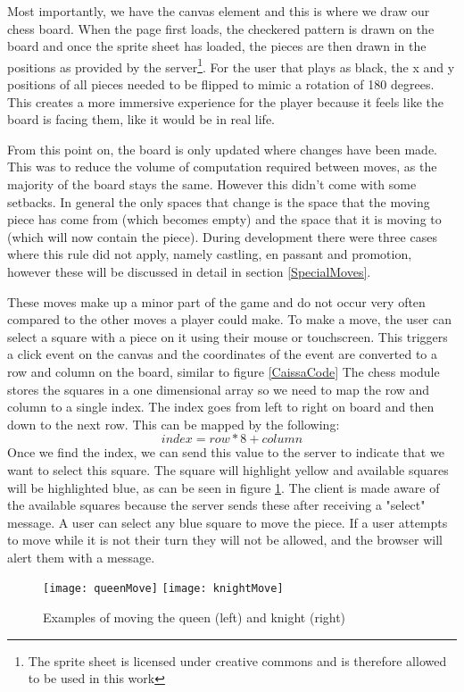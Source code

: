 Most importantly, we have the canvas element and this is where we draw our chess board. When the page first loads, the checkered pattern is drawn on the board and once the sprite sheet \cite{SpriteSheet} has loaded, the pieces are then drawn in the positions as provided by the server\footnote{The sprite sheet is licensed under creative commons and is therefore allowed to be used in this work}. For the user that plays as black, the x and y positions of all pieces needed to be flipped to mimic a rotation of 180 degrees. This creates a more immersive experience for the player because it feels like the board is facing them, like it would be in real life.

From this point on, the board is only updated where changes have been made. This was to reduce the volume of computation required between moves, as the majority of the board stays the same. However this didn't come with some setbacks. In general the only spaces that change is the space that the moving piece has come from (which becomes empty) and the space that it is moving to (which will now contain the piece). During development there were three cases where this rule did not apply, namely castling, en passant and promotion, however these will be discussed in detail in section \ref{SpecialMoves}.

These moves make up a minor part of the game and do not occur very often compared to the other moves a player could make. To make a move, the user can select a square with a piece on it using their mouse or touchscreen. This triggers a click event on the canvas and the coordinates of the event are converted to a row and column on the board, similar to figure \ref{CaissaCode} The chess module stores the squares in a one dimensional array so we need to map the row and column to a single index. The index goes from left to right on board and then down to the next row. This can be mapped by the following:$$index = row * 8 + column$$Once we find the index, we can send this value to the server to indicate that we want to select this square. The square will highlight yellow and available squares will be highlighted blue, as can be seen in figure \ref{exampleMove}. The client is made aware of the available squares because the server sends these after receiving a "select" message. A user can select any blue square to move the piece. If a user attempts to move while it is not their turn they will not be allowed, and the browser will alert them with a message.

\begin{figure}
    \begin{center}
        \texttt{[image: queenMove]}
        \texttt{[image: knightMove]}
        \caption{Examples of moving the queen (left) and knight (right)}
        \label{exampleMove}
    \end{center}
\end{figure}

